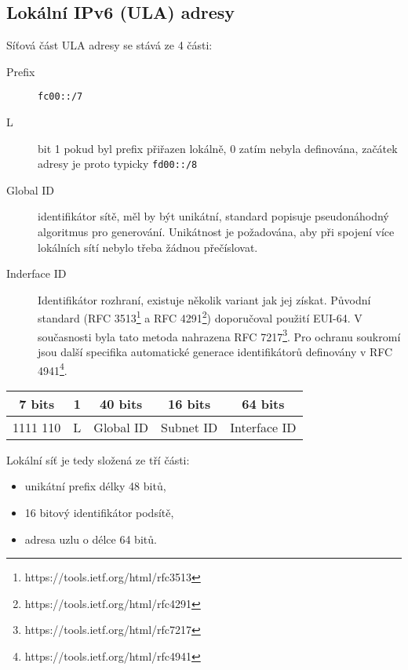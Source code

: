 \subsection{Lokální IPv6 (ULA) adresy}\label{ula}
Síťová část ULA adresy se stává ze 4 části:
\begin{description}
    \item [Prefix] {\tt fc00::/7}
    \item [L] bit 1 pokud byl prefix přiřazen lokálně, 0 zatím nebyla
        definována, začátek adresy je proto typicky {\tt fd00::/8}
    \item [Global ID] identifikátor sítě, měl by být unikátní, standard
        popisuje pseudonáhodný algoritmus pro generování. Unikátnost je
        požadována, aby při spojení více lokálních sítí nebylo třeba žádnou
        přečíslovat.
    \item [Inderface ID] Identifikátor rozhraní, existuje několik variant jak
        jej získat. Původní standard (RFC
        3513\footnote{https://tools.ietf.org/html/rfc3513} a RFC
        4291\footnote{https://tools.ietf.org/html/rfc4291}) doporučoval použití
        EUI-64. V současnosti byla tato metoda nahrazena RFC
        7217\footnote{https://tools.ietf.org/html/rfc7217}. Pro ochranu
        soukromí jsou další specifika automatické generace identifikátorů
        definovány v RFC 4941\footnote{https://tools.ietf.org/html/rfc4941}.
\end{description}

\begin{table}[ht!]
    \begin{center}
        \begin{tabular}{c|c|c|c|c}
            7 bits & 1 &  40 bits  &  16 bits  & 64 bits \\
            \hline
            1111 110 & L & Global ID & Subnet ID & Interface ID \\
            \hline
        \end{tabular}
    \end{center}
\end{table}

Lokální síť je tedy složená ze tří části:
\begin{itemize}
    \item unikátní prefix délky 48 bitů,
    \item 16 bitový identifikátor podsítě,
    \item adresa uzlu o délce 64 bitů.
\end{itemize}

